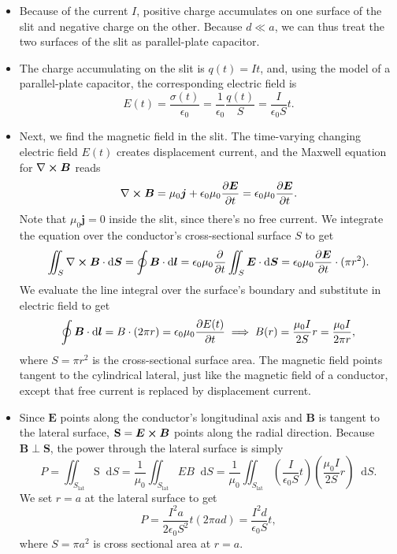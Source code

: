 \documentclass[11pt, a4paper]{article}
\newcommand{\diff}{\mathop{}\!\mathrm{d}} %
\renewcommand{\vec}[1]{\bm{#1}} %
\newcommand{\E}{\vec{E}}  %
\newcommand{\B}{\vec{B}}  %
\renewcommand{\S}{\mathbf{S}}  %
\renewcommand{\SS}{\mathrm{S}}  %
\newcommand{\ee}{\epsilon_{0}}  %
\newcommand{\mm}{\mu_{0}}  %
\newcommand{\m}{\vec{m}}  %
\renewcommand{\curl}{\nabla \cross}
\begin{document}
\begin{itemize}
	\item Because of the current $ I $, positive charge accumulates on one surface of the slit and negative charge on the other. Because $ d \ll a $, we can thus treat the two surfaces of the slit as parallel-plate capacitor. 
	
	\item The charge accumulating on the slit is $ q(t) = It $, and, using the model of a parallel-plate capacitor, the corresponding electric field is
	\begin{equation*}
		E(t) = \frac{\sigma(t)}{\ee} = \frac{1}{\ee}\frac{q(t)}{S} = \frac{I}{\ee S}t.
	\end{equation*}
	
	\item Next, we find the magnetic field in the slit. The time-varying changing electric field $ E(t) $ creates displacement current, and the Maxwell equation for $ \curl \B $ reads
	\begin{equation*}
		\curl \B  = \mm \vec{j} + \ee\mm \pdv{\E}{t} = \ee\mm \pdv{\E}{t}.
	\end{equation*}
	Note that $ \mm \vec{j} = 0 $ inside the slit, since there's no free current. We integrate the equation over the conductor's cross-sectional surface $ S $ to get
	\begin{equation*}
		\iint_{S} \curl \B \cdot \diff \vec{S} = \oint \B \cdot \diff \vec{l}  = \ee \mm \pdv{t}\iint_{S}\E\cdot \diff \vec{S} =  \ee \mm \pdv{\E}{t} \cdot (\pi r^{2}).
	\end{equation*}
	We evaluate the line integral over the surface's boundary and substitute in electric field to get
	\begin{equation*}
        \oint \B \cdot \diff \vec{l} = B \cdot (2\pi r) = \ee \mm \pdv{E(t)}{t} \implies B(r) = \frac{\mm I}{2S} r = \frac{\mm I }{2 \pi r},
	\end{equation*}
	where $ S = \pi r^{2} $ is the cross-sectional surface area. The magnetic field points tangent to the cylindrical lateral, just like the magnetic field of a conductor, except that free current is replaced by displacement current. 
	
	
	\item Since $ \E $ points along the conductor's longitudinal axis and $ \B $ is tangent to the lateral surface, $ \S = \E \cross \B $ points along the radial direction. Because $ \B \perp \S$, the power through the lateral surface is simply
	\begin{equation*}
		P = \iint_{S_{\text{lat}}} \SS \diff S = \frac{1}{\mm}\iint_{S_\text{lat}} EB \diff S = \frac{1}{\mm} \iint_{S_{\text{lat}}}  \left(\frac{I}{\ee S}t\right)\left(\frac{\mm I}{2S} r\right) \diff S.
	\end{equation*}
	We set $ r = a $ at the lateral surface to get
	\begin{equation*}
		P = \frac{I^{2}a}{2\ee S^{2}}t (2\pi a d) = \frac{I^{2}d}{\ee S} t,
	\end{equation*}
	where $ S = \pi a^{2} $ is cross sectional area at $ r = a $.
	

\end{itemize}
\end{document}
